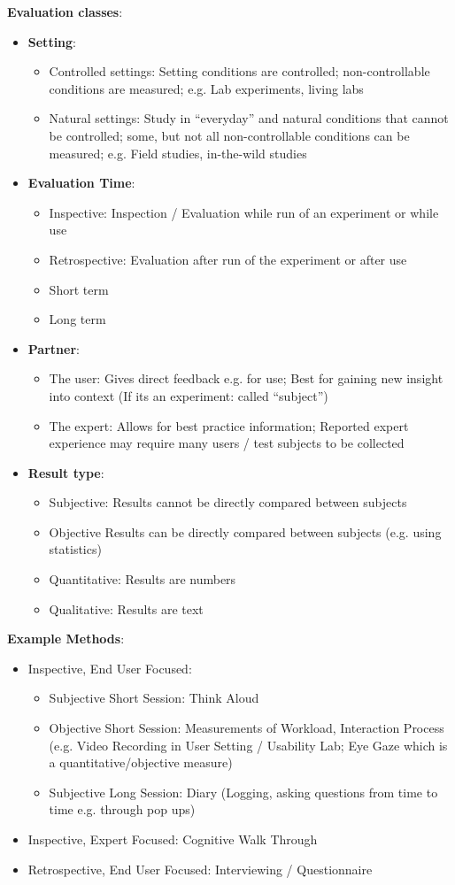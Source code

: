 \textbf{Evaluation classes}:
\begin{itemize}
\item \textbf{Setting}:
\begin{itemize}
\item Controlled settings: Setting conditions are controlled; non-controllable conditions are measured; e.g. Lab experiments, living labs
\item Natural settings: Study in “everyday” and natural conditions that cannot be controlled; some, but not all non-controllable conditions can be measured; e.g. Field studies, in-the-wild studies
\end{itemize}
\item \textbf{Evaluation Time}:
\begin{itemize}
\item Inspective: Inspection / Evaluation while run of an experiment or while use
\item Retrospective: Evaluation after run of the experiment or after use
\item Short term
\item Long term
\end{itemize}
\item \textbf{Partner}:
\begin{itemize}
\item The user: Gives direct feedback e.g. for use; Best for gaining new insight into context (If its an experiment: called “subject”)
\item The expert: Allows for best practice information; Reported expert experience may require many users / test subjects to be collected
\end{itemize}
\item \textbf{Result type}:
\begin{itemize}
\item Subjective: Results cannot be directly compared between subjects
\item Objective Results can be directly compared between subjects (e.g. using statistics)
\item Quantitative: Results are numbers
\item Qualitative: Results are text
\end{itemize}
\end{itemize}
\textbf{Example Methods}:
\begin{itemize}
\item Inspective, End User Focused:
\begin{itemize}
\item Subjective Short Session: Think Aloud
\item Objective Short Session: Measurements of Workload, Interaction Process (e.g. Video Recording in User Setting / Usability Lab; Eye Gaze which is a quantitative/objective measure)
\item Subjective Long Session: Diary (Logging, asking questions from time to time e.g. through pop ups)
\end{itemize}
\item Inspective, Expert Focused: Cognitive Walk Through
\item Retrospective, End User Focused: Interviewing / Questionnaire
\end{itemize}
